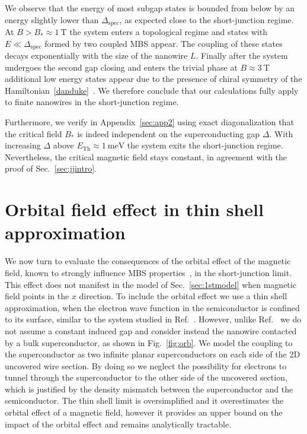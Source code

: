 We observe that the energy of most subgap states is bounded from below by an energy slightly lower than $\Delta_\textrm{spec}$, as expected close to the short-junction regime.
At $B > B_* \approx \SI{1}{\tesla}$ the system enters a topological regime and states with $E \ll \Delta_\textrm{spec}$ formed by two coupled MBS appear.
The coupling of these states decays exponentially with the size of the nanowire $L$.
Finally after the system undergoes the second gap closing and enters the trivial phase at $B \approx \SI{3}{\tesla}$ additional low energy states appear due to the presence of chiral symmetry of the Hamiltonian~\eqref{danduke}~\cite{Schnyder2009, Ryu2010, Tewari2012}.
We therefore conclude that our calculations fully apply to finite nanowires in the short-junction regime.

Furthermore, we verify in Appendix~\ref{sec:app2} using exact diagonalization that the critical field $B_*$ is indeed independent on the superconducting gap $\Delta$.
With increasing $\Delta$ above $E_\mathrm{Th}\approx \SI{1}{\meV}$ the system exits the short-junction regime.
Nevertheless, the critical magnetic field stays constant, in agreement with the proof of Sec.~\ref{sec:jjintro}.

\section{Orbital field effect in thin shell approximation}
\label{sec:orb}

We now turn to evaluate the consequences of the orbital effect of the magnetic field, known to strongly influence MBS properties~\cite{Lim2013, Osca2014b, Osca2015, Nijholt2016}, in the short-junction limit.
This effect does not manifest in the model of Sec.~\ref{sec:1stmodel} when magnetic field points in the $x$ direction.
To include the orbital effect we use a thin shell approximation, when the electron wave function in the semiconductor is confined to its surface, similar to the system studied in Ref.~\cite{Osca2014b}.
However, unlike Ref.~\cite{Osca2014b} we do not assume a constant induced gap and consider instead the nanowire contacted by a bulk superconductor, as shown in Fig.~\ref{fig:orb}.
We model the coupling to the superconductor as two infinite planar superconductors on each side of the 2D uncovered wire section.
By doing so we neglect the possibility for electrons to tunnel through the superconductor to the other side of the uncovered section, which is justified by the density mismatch between the superconductor and the semiconductor.
The thin shell limit is oversimplified and it overestimates the orbital effect of a magnetic field, however it provides an upper bound on the impact of the orbital effect and remains analytically tractable.

